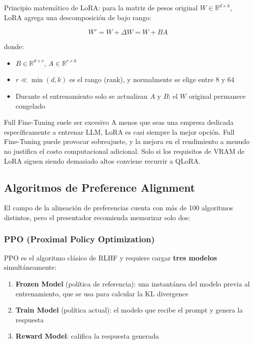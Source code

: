 Principio matemático de LoRA: para la matriz de pesos original $W \in \mathbb{R}^{d \times k}$, LoRA agrega una descomposición de bajo rango:

$$W' = W + \Delta W = W + BA$$

donde:
\begin{itemize}
    \item $B \in \mathbb{R}^{d \times r}$, $A \in \mathbb{R}^{r \times k}$
    \item $r \ll \min(d, k)$ es el rango (rank), y normalmente se elige entre 8 y 64
    \item Durante el entrenamiento solo se actualizan $A$ y $B$; el $W$ original permanece congelado
\end{itemize}

\begin{warningbox}{Full Fine-Tuning suele ser excesivo}
A menos que seas una empresa dedicada específicamente a entrenar LLM, LoRA es casi siempre la mejor opción. Full Fine-Tuning puede provocar sobreajuste, y la mejora en el rendimiento a menudo no justifica el costo computacional adicional. Solo si los requisitos de VRAM de LoRA siguen siendo demasiado altos conviene recurrir a QLoRA.
\end{warningbox}

\subsection{Algoritmos de Preference Alignment}

El campo de la alineación de preferencias cuenta con más de 100 algoritmos distintos, pero el presentador recomienda memorizar solo dos:

\subsubsection{PPO (Proximal Policy Optimization)}

PPO es el algoritmo clásico de RLHF y requiere cargar \textbf{tres modelos} simultáneamente:

\begin{enumerate}
    \item \textbf{Frozen Model} (política de referencia): una instantánea del modelo previa al entrenamiento, que se usa para calcular la KL divergence
    \item \textbf{Train Model} (política actual): el modelo que recibe el prompt y genera la respuesta
    \item \textbf{Reward Model}: califica la respuesta generada
\end{enumerate}

